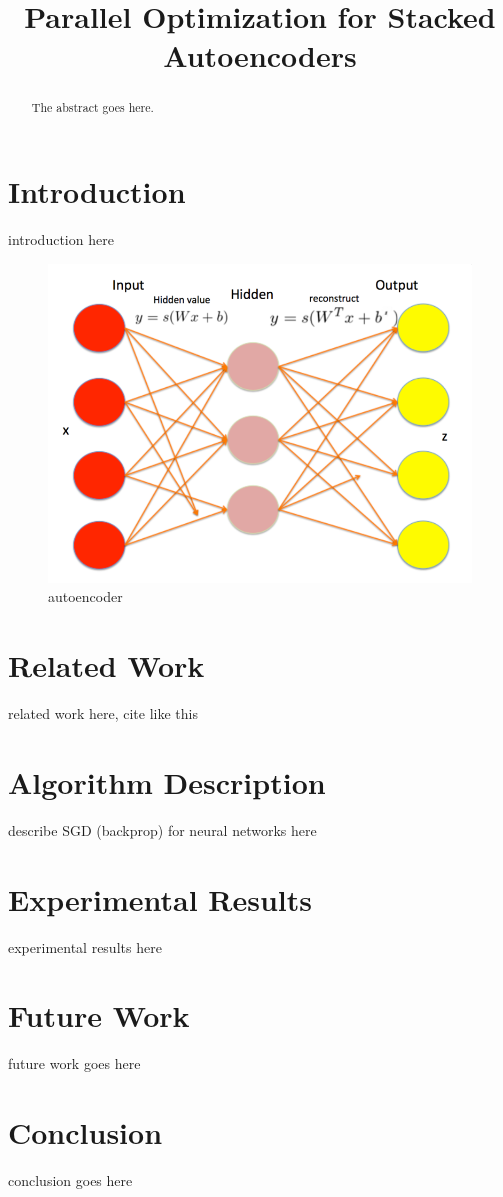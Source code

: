 \documentclass[conference]{IEEEtran}
\begin{document}
\title{Parallel Optimization for Stacked Autoencoders}

\author{
\and
{}
}

\maketitle

\begin{abstract}
The abstract goes here.
\end{abstract}

\section{Introduction}
introduction here

\begin{figure}[h]
\centering
\includegraphics[width=0.9\linewidth]{autoencoder.png}
\caption{autoencoder}
\end{figure}

\section{Related Work}
related work here, cite like this \cite{vincent2010stacked}

\section{Algorithm Description}
describe SGD (backprop) for neural networks here

\section{Experimental Results}
experimental results here

\section{Future Work}
future work goes here

\section{Conclusion}
conclusion goes here



\end{document}
